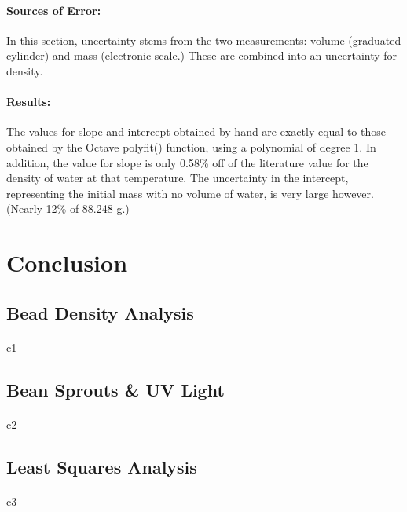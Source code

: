 \documentclass{article}
\begin{document}
        \paragraph{Sources of Error: } In this section, uncertainty stems from the two measurements: volume (graduated cylinder) and mass (electronic scale.) These are combined into an uncertainty for density.
        \paragraph{Results: } The values for slope and intercept obtained by hand are exactly equal to those obtained by the Octave polyfit() function, using a polynomial of degree 1. In addition, the value for slope is only 0.58\% off of the literature value for the density of water at that temperature. The uncertainty in the intercept, representing the initial mass with no volume of water, is very large however. (Nearly 12\% of  88.248 g.)


\newpage
\section{Conclusion}
    \subsection{Bead Density Analysis}
        \paragraph{} c1
    \subsection{Bean Sprouts \& UV Light}
        \paragraph{} c2
    \subsection{Least Squares Analysis}
        \paragraph{} c3

\newpage
\end{document}

